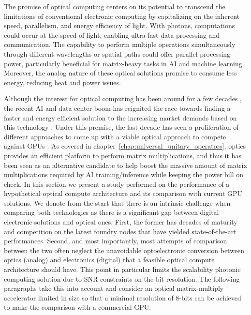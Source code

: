 The promise of optical computing centers on its potential to transcend the limitations of conventional electronic computing by capitalizing on the inherent speed, parallelism, and energy efficiency of light.
With photons, computations could occur at the speed of light, enabling ultra-fast data processing and communication.
The capability to perform multiple operations simultaneously through different wavelengths or spatial paths could offer parallel processing power, particularly beneficial for matrix-heavy tasks in AI and machine learning.
Moreover, the analog nature of these optical solutions promise to consume less energy, reducing heat and power issues.

Although the interest for optical computing has been around for a few decades \cite{psaltis_holography_1990}, the recent AI and data center boom has reignited the race towards finding a faster and energy efficient solution to the increasing market demands based on this technology \cite{noauthor_could_2024}.
Under this premise, the last decade has seen a proliferation of different approaches to come up with a viable optical approach to compete against GPUs \cite{zhu_space-efficient_2022,hu_diffractive_2024,zhu_space-efficient_2022,on_photonic_2022,feldmann_parallel_2021}.
As covered in chapter~\ref{chap:universal_unitary_operators}, optics provides an efficient platform to perform matrix multiplications, and thus it has been seen as an alternative candidate to help boost the massive amount of matrix multiplications required by AI training/inference while keeping the power bill on check.
In this section we present a study performed on the performance of a hypothetical optical compute architecture and its comparison with current GPU solutions.
We denote from the start that there is an intrinsic challenge when comparing both technologies as there is a significant gap between digital electronic solutions and optical ones.
First, the former has decades of maturity and competition on the latest foundry nodes that have yielded state-of-the-art performances.
Second, and most importantly, most attempts of comparison between the two often neglect the unavoidable optoelectronic conversion between optics (analog) and electronics (digital) that a feasible optical compute architecture should have.
This point in particular limits the scalability photonic computing solution due to SNR constraints on the bit resolution.
The following paragraphs take this into account and consider an optical matrix-multiply accelerator limited in size so that a minimal resolution of 8-bits can be achieved to make the comparison with a commercial GPU.


